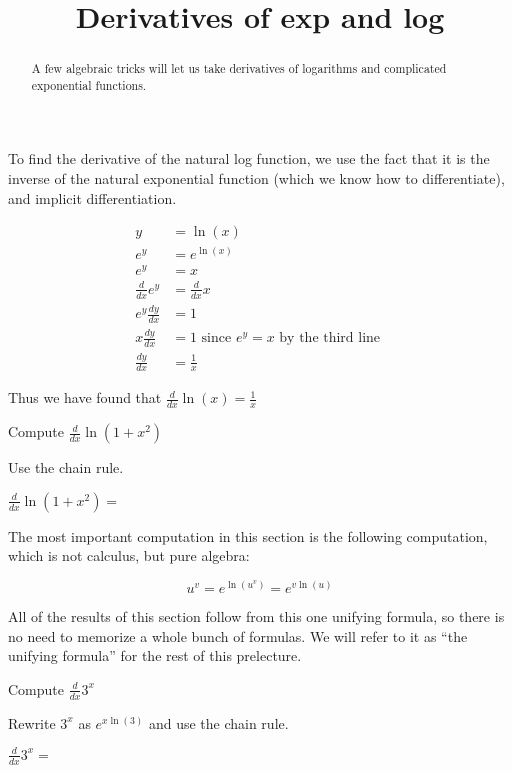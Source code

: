 \documentclass{ximera}
\title{Derivatives of exp and log}
\begin{document}
\begin{abstract}
  A few algebraic tricks will let us take derivatives of logarithms and complicated exponential functions.
\end{abstract}

\maketitle

To find the derivative of the natural log function, we use the fact
that it is the inverse of the natural exponential function (which we
know how to differentiate), and implicit differentiation.

\begin{align*}
y&=\ln(x)\\
e^y &= e^{\ln(x)}\\
e^y &= x\\                      
\frac{d}{dx} e^y &= \frac{d}{dx} x\\
e^y\frac{dy}{dx} &= 1\\
x\frac{dy}{dx} &= 1 \text{ since $e^y=x$ by the third line }\\
\frac{dy}{dx} &= \frac{1}{x}
\end{align*}

Thus we have found that $\frac{d}{dx} \ln(x) = \frac{1}{x}$

\begin{question}
	Compute $\frac{d}{dx} \ln(1+x^2)$
	\begin{hint}
	  Use the chain rule.
	\end{hint}
	$\frac{d}{dx} \ln(1+x^2)=$
\end{question}

The most important computation in this section is the following computation, which is not  calculus, but pure algebra:

\[
u^v = e^{\ln(u^v)} = e^{v\ln(u)}
\]

All of the results of this section follow from this one unifying
formula, so there is no need to memorize a whole bunch of formulas.
We will refer to it as ``the unifying formula'' for the rest of this
prelecture.


\begin{question}
  Compute $\frac{d}{dx} 3^x $
  \begin{hint}
    Rewrite $3^x$ as $e^{x\ln(3)}$ and use the chain rule.
  \end{hint}
  $\frac{d}{dx} 3^x =$  
\end{question}
\end{document}
